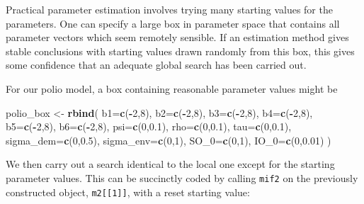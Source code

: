 \documentclass[]{article}
\newenvironment{Shaded}{\begin{snugshade}}{\end{snugshade}}
\newcommand{\KeywordTok}[1]{\textcolor[rgb]{0.13,0.29,0.53}{\textbf{#1}}}
\newcommand{\DataTypeTok}[1]{\textcolor[rgb]{0.13,0.29,0.53}{#1}}
\newcommand{\DecValTok}[1]{\textcolor[rgb]{0.00,0.00,0.81}{#1}}
\newcommand{\FloatTok}[1]{\textcolor[rgb]{0.00,0.00,0.81}{#1}}
\newcommand{\StringTok}[1]{\textcolor[rgb]{0.31,0.60,0.02}{#1}}
\newcommand{\OperatorTok}[1]{\textcolor[rgb]{0.81,0.36,0.00}{\textbf{#1}}}
\newcommand{\NormalTok}[1]{#1}
\begin{document}
Practical parameter estimation involves trying many starting values for
the parameters. One can specify a large box in parameter space that
contains all parameter vectors which seem remotely sensible. If an
estimation method gives stable conclusions with starting values drawn
randomly from this box, this gives some confidence that an adequate
global search has been carried out.

For our polio model, a box containing reasonable parameter values might
be

\begin{Shaded}
\begin{Highlighting}[]
\NormalTok{polio_box <-}\StringTok{ }\KeywordTok{rbind}\NormalTok{(}
  \DataTypeTok{b1=}\KeywordTok{c}\NormalTok{(}\OperatorTok{-}\DecValTok{2}\NormalTok{,}\DecValTok{8}\NormalTok{),}
  \DataTypeTok{b2=}\KeywordTok{c}\NormalTok{(}\OperatorTok{-}\DecValTok{2}\NormalTok{,}\DecValTok{8}\NormalTok{),}
  \DataTypeTok{b3=}\KeywordTok{c}\NormalTok{(}\OperatorTok{-}\DecValTok{2}\NormalTok{,}\DecValTok{8}\NormalTok{),}
  \DataTypeTok{b4=}\KeywordTok{c}\NormalTok{(}\OperatorTok{-}\DecValTok{2}\NormalTok{,}\DecValTok{8}\NormalTok{),}
  \DataTypeTok{b5=}\KeywordTok{c}\NormalTok{(}\OperatorTok{-}\DecValTok{2}\NormalTok{,}\DecValTok{8}\NormalTok{),}
  \DataTypeTok{b6=}\KeywordTok{c}\NormalTok{(}\OperatorTok{-}\DecValTok{2}\NormalTok{,}\DecValTok{8}\NormalTok{),}
  \DataTypeTok{psi=}\KeywordTok{c}\NormalTok{(}\DecValTok{0}\NormalTok{,}\FloatTok{0.1}\NormalTok{),}
  \DataTypeTok{rho=}\KeywordTok{c}\NormalTok{(}\DecValTok{0}\NormalTok{,}\FloatTok{0.1}\NormalTok{),}
  \DataTypeTok{tau=}\KeywordTok{c}\NormalTok{(}\DecValTok{0}\NormalTok{,}\FloatTok{0.1}\NormalTok{),}
  \DataTypeTok{sigma_dem=}\KeywordTok{c}\NormalTok{(}\DecValTok{0}\NormalTok{,}\FloatTok{0.5}\NormalTok{),}
  \DataTypeTok{sigma_env=}\KeywordTok{c}\NormalTok{(}\DecValTok{0}\NormalTok{,}\DecValTok{1}\NormalTok{),}
  \DataTypeTok{SO_0=}\KeywordTok{c}\NormalTok{(}\DecValTok{0}\NormalTok{,}\DecValTok{1}\NormalTok{),}
  \DataTypeTok{IO_0=}\KeywordTok{c}\NormalTok{(}\DecValTok{0}\NormalTok{,}\FloatTok{0.01}\NormalTok{)}
\NormalTok{)}
\end{Highlighting}
\end{Shaded}

We then carry out a search identical to the local one except for the
starting parameter values. This can be succinctly coded by calling
\texttt{mif2} on the previously constructed object,
\texttt{m2{[}{[}1{]}{]}}, with a reset starting value:
\end{document}
